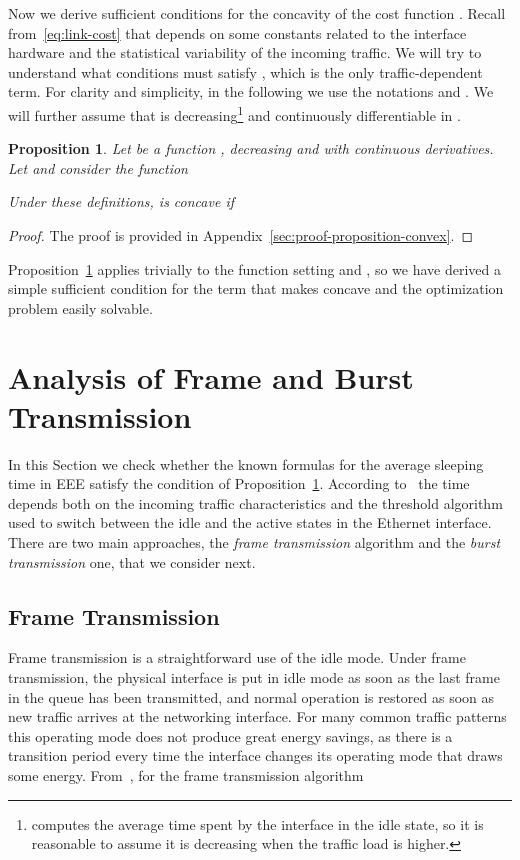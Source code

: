\documentclass[journal,english,twocolumn,10pt,letterpaper]{IEEEtran}
\newcommand{\added}[1]{{#1}}
\newtheorem{proposition}[theorem]{Proposition}
\begin{document}
Now we derive sufficient conditions for the concavity of the cost function
. Recall from~\eqref{eq:link-cost} that  depends on some
constants related to the interface hardware and the statistical variability of
the incoming traffic. We will try to understand what conditions \added{must
  satisfy }, which is the only traffic-dependent term. For clarity and
simplicity, in the following we use the notations  and
. We will further assume that  is
decreasing\footnote{ computes the average time spent by the interface
  in the idle state, so it is reasonable to assume it is decreasing when the
  traffic load is higher.} and continuously differentiable in
.
\begin{proposition}
  \label{prop:convex}
  Let  be a function , decreasing and with
  continuous derivatives. Let  and consider the function
  
  Under these definitions,  is concave if
  
\end{proposition}
\begin{proof}
  The proof is provided in \added{Appendix}~\ref{sec:proof-proposition-convex}.
\end{proof}

Proposition~\ref{prop:convex} applies trivially to the function 
setting  and , \added{so} we have
derived a simple sufficient condition for the  term that makes
 concave and the optimization problem easily solvable.

\section{Analysis of Frame and Burst Transmission}
\label{sec:toff}

In this Section we check whether the known formulas for the average sleeping
time in EEE satisfy the condition of Proposition~\ref{prop:convex}. According
to~\cite{herreria12:_gi_g_model_gb_energ_effic_ether} the time 
depends both on the incoming traffic characteristics and the threshold
algorithm used to switch between the idle and the active states in the
Ethernet interface. There are two main approaches, the \emph{frame
  transmission} algorithm and the \emph{burst transmission} one, that we
consider next.

\subsection{Frame Transmission}

Frame transmission is a straightforward use of the idle mode. Under frame
transmission, the physical interface is put in idle mode as soon as the last
frame in the queue has been transmitted, and normal operation is restored as
soon as new traffic arrives at the networking interface. For many common
traffic patterns this operating mode does not produce great energy savings, as
there is a transition period every time the interface changes its operating
mode that draws some energy.
From~\cite{herreria12:_gi_g_model_gb_energ_effic_ether}, for the frame
transmission algorithm
\end{document}
